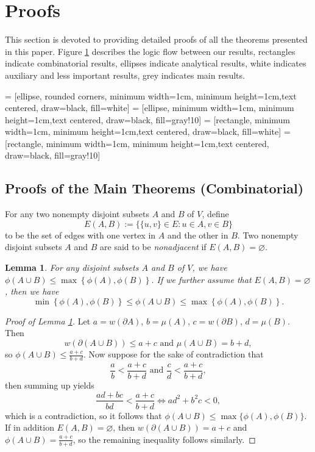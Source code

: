 \documentclass[12pt, reqno]{article}
\newtheorem{lemma}{Lemma}
\begin{document}
\section{Proofs}
This section is devoted to providing detailed proofs of all the theorems presented in this paper. Figure \ref{fig:placeholder} describes the logic flow between our results, rectangles indicate combinatorial results, ellipses indicate analytical results, white indicates auxiliary and less important results, grey indicates main results.

 = [ellipse, rounded corners, minimum width=1cm, minimum height=1cm,text centered, draw=black, fill=white]
 = [ellipse, minimum width=1cm, minimum height=1cm,text centered, draw=black, fill=gray!10]
 = [rectangle, minimum width=1cm, minimum height=1cm,text centered, draw=black, fill=white]
 = [rectangle, minimum width=1cm, minimum height=1cm,text centered, draw=black, fill=gray!10]

\begin{figure}[omitted: a diagram of this paper's results, not reproduced here]\label{fig:placeholder}\end{figure}

\subsection{Proofs of the Main Theorems (Combinatorial)}
For any two nonempty disjoint subsets $A$ and $B$ of $V$, define \[E(A,B):=\{\{u,v\}\in E:u\in A,v\in B\}\] to be the set of edges with one vertex in $A$ and the other in $B$. Two nonempty disjoint subsets $A$ and $B$ are said to be \emph{nonadjacent} if $E(A,B)=\varnothing$.

\begin{lemma}\label{lemma:basic-phi}
For any disjoint subsets $A$ and $B$ of $V$, we have $\phi(A\cup B)\le \max\left\{\phi(A),\phi(B)\right\}$. If we further assume that $E(A,B)=\varnothing$, then we have $$\min\left\{\phi(A),\phi(B)\right\} \le \phi(A\cup B)\le \max\left\{\phi(A),\phi(B)\right\}.$$
\end{lemma}

\begin{proof}[Proof of Lemma \ref{lemma:basic-phi}]
Let $a=w(\partial A)$, $b=\mu(A)$, $c=w(\partial B)$, $d=\mu(B)$. Then \[w(\partial(A\cup B))\le a+c\text{ and }\mu(A\cup B)=b+d,\] so $\phi(A\cup B)\le\frac{a+c}{b+d}$. Now suppose for the sake of contradiction that \[\frac ab<\frac{a+c}{b+d}\text{ and }\frac cd<\frac{a+c}{b+d},\] then summing up yields \[\frac{ad+bc}{bd}<\frac{a+c}{b+d}\iff ad^2+b^2c<0,\] which is a contradiction, so it follows that $\phi(A\cup B)\le\max\{\phi(A),\phi(B)\}$. If in addition $E(A,B)=\varnothing$, then $w(\partial(A\cup B))=a+c$ and $\phi(A\cup B)=\frac{a+c}{b+d}$, so the remaining inequality follows similarly.
\end{proof}
\end{document}
